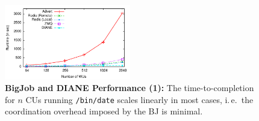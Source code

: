 \documentclass[conference,final]{IEEEtran}
\makeatletter
\def\reduwave{\bgroup \markoverwith{\lower3.5\p@\hbox{\sixly \textcolor{red}{\char58}}}\ULon}
\newcommand{\jwave}[1]{ {\reduwave{#1}}}
\newcommand{\jhanote}[1]{ {\textcolor{red} { ***shantenu: #1 }}}
\newcommand{\alnote}[1]{ {\textcolor{blue} { ***andre: #1 }}}
\newcommand{\jwave}[1]{#1}
\newcommand{\alnote}[1]{}
\newcommand{\jhanote}[1]{}
\newcommand{\cu}{CU}
\newcommand{\upp}{\vspace*{-0.5em}}
\makeatother
\begin{document}






\begin{figure}[htbp] \centering
\includegraphics[width=0.49\textwidth]{perf/bigjob-varying-wus-alamo.pdf}
\caption{\textbf{BigJob and DIANE Performance (1):} The 
time-to-completion for $n$ \cu s running \texttt{/bin/date} scales linearly
in most cases, i.\,e.\ the coordination overhead imposed by the BJ is 
minimal.\upp\upp}
\label{fig:perf_bigjob-varying-wus} \end{figure}
\end{document}
